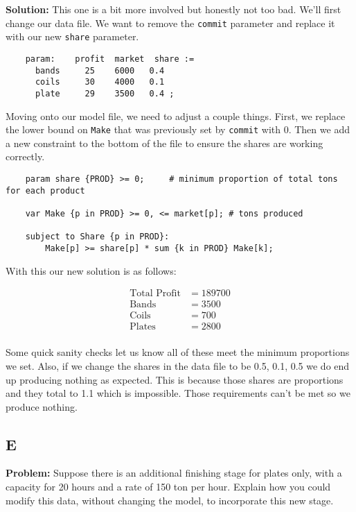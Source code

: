\noindent\textbf{Solution:} This one is a bit more involved but honestly not too bad. We'll first change our data file. We want to remove the \texttt{commit} parameter and replace it with our new \texttt{share} parameter. 

\begin{lstlisting}
	param:    profit  market  share :=
	  bands     25    6000   0.4
	  coils     30    4000   0.1
	  plate     29    3500   0.4 ;
\end{lstlisting}

Moving onto our model file, we need to adjust a couple things. First, we replace the lower bound on \texttt{Make} that was previously set by \texttt{commit} with 0. Then we add a new constraint to the bottom of the file to ensure the shares are working correctly.

\begin{lstlisting}
	param share {PROD} >= 0;     # minimum proportion of total tons for each product

	var Make {p in PROD} >= 0, <= market[p]; # tons produced

	subject to Share {p in PROD}:
	    Make[p] >= share[p] * sum {k in PROD} Make[k];
\end{lstlisting}

With this our new solution is as follows:

\begin{align*}
	\text{Total Profit} &= 189700 \\
	\text{Bands} &= 3500 \\
	\text{Coils} &= 700 \\
	\text{Plates} &= 2800 \\
\end{align*}

Some quick sanity checks let us know all of these meet the minimum proportions we set. Also, if we change the shares in the data file to be 0.5, 0.1, 0.5 we do end up producing nothing as expected. This is because those shares are proportions and they total to 1.1 which is impossible. Those requirements can't be met so we produce nothing.

\subsection*{E}

\textbf{Problem:} Suppose there is an additional finishing stage for plates only, with a capacity for 20 hours and a rate of 150 ton per hour. Explain how you could modify this data, without changing the model, to incorporate this new stage. 

